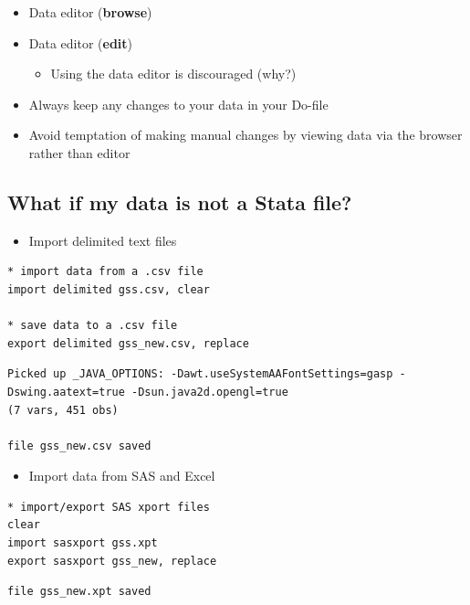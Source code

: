 \documentclass[]{book}
\providecommand{\tightlist}{%
  \setlength{\itemsep}{0pt}\setlength{\parskip}{0pt}}
\begin{document}
\begin{itemize}
\tightlist
\item
  Data editor (\textbf{browse})
\item
  Data editor (\textbf{edit})

  \begin{itemize}
  \tightlist
  \item
    Using the data editor is discouraged (why?)
  \end{itemize}
\item
  Always keep any changes to your data in your Do-file
\item
  Avoid temptation of making manual changes by viewing data via the
  browser rather than editor
\end{itemize}

\subsection{What if my data is not a Stata
file?}\label{what-if-my-data-is-not-a-stata-file}

\begin{itemize}
\tightlist
\item
  Import delimited text files
\end{itemize}

\begin{verbatim}
* import data from a .csv file
import delimited gss.csv, clear

* save data to a .csv file
export delimited gss_new.csv, replace
\end{verbatim}

\begin{verbatim}
Picked up _JAVA_OPTIONS: -Dawt.useSystemAAFontSettings=gasp -Dswing.aatext=true -Dsun.java2d.opengl=true
(7 vars, 451 obs)

file gss_new.csv saved
\end{verbatim}

\begin{itemize}
\tightlist
\item
  Import data from SAS and Excel
\end{itemize}

\begin{verbatim}
* import/export SAS xport files
clear
import sasxport gss.xpt
export sasxport gss_new, replace
\end{verbatim}

\begin{verbatim}
file gss_new.xpt saved
\end{verbatim}
\end{document}
